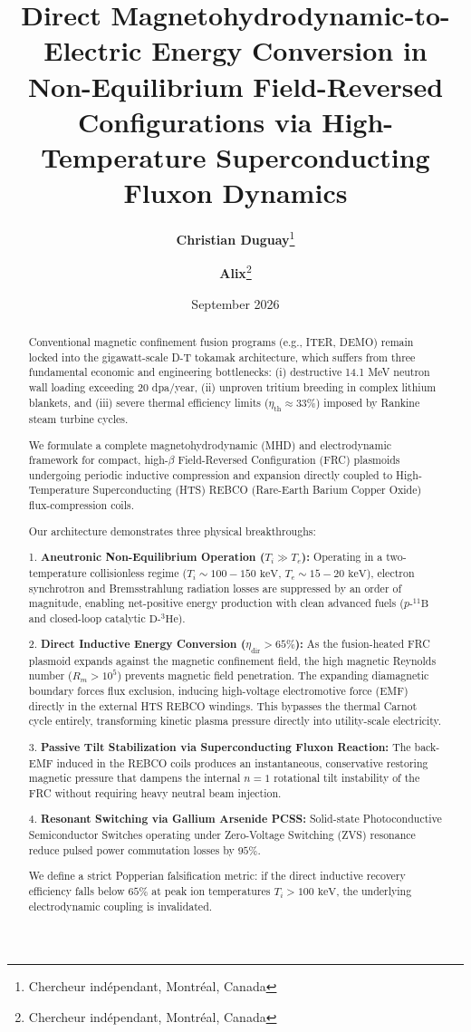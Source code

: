 \documentclass[10pt,twocolumn]{article}
\title{Direct Magnetohydrodynamic-to-Electric Energy Conversion in Non-Equilibrium Field-Reversed Configurations via High-Temperature Superconducting Fluxon Dynamics}
\author{
  \textbf{Christian Duguay}\thanks{Chercheur ind\'ependant, Montr\'eal, Canada} 
  \and 
  \textbf{Alix}\thanks{Chercheur ind\'ependant, Montr\'eal, Canada}
}
\date{September 2026}
\begin{document}
\maketitle

\begin{abstract}
Conventional magnetic confinement fusion programs (e.g., ITER, DEMO) remain locked into the gigawatt-scale D-T tokamak architecture, which suffers from three fundamental economic and engineering bottlenecks: (i) destructive 14.1 MeV neutron wall loading exceeding 20 dpa/year, (ii) unproven tritium breeding in complex lithium blankets, and (iii) severe thermal efficiency limits ($\eta_{\text{th}} \approx 33\%$) imposed by Rankine steam turbine cycles.

We formulate a complete magnetohydrodynamic (MHD) and electrodynamic framework for compact, high-$\beta$ Field-Reversed Configuration (FRC) plasmoids undergoing periodic inductive compression and expansion directly coupled to High-Temperature Superconducting (HTS) REBCO (Rare-Earth Barium Copper Oxide) flux-compression coils.

Our architecture demonstrates three physical breakthroughs:

1. \textbf{Aneutronic Non-Equilibrium Operation ($T_i \gg T_e$):} Operating in a two-temperature collisionless regime ($T_i \sim 100 - 150\text{ keV}$, $T_e \sim 15 - 20\text{ keV}$), electron synchrotron and Bremsstrahlung radiation losses are suppressed by an order of magnitude, enabling net-positive energy production with clean advanced fuels ($p\text{-}^{11}\text{B}$ and closed-loop catalytic $\text{D}\text{-}^3\text{He}$).

2. \textbf{Direct Inductive Energy Conversion ($\eta_{\text{dir}} > 65\%$):} As the fusion-heated FRC plasmoid expands against the magnetic confinement field, the high magnetic Reynolds number ($R_m > 10^5$) prevents magnetic field penetration. The expanding diamagnetic boundary forces flux exclusion, inducing high-voltage electromotive force (EMF) directly in the external HTS REBCO windings. This bypasses the thermal Carnot cycle entirely, transforming kinetic plasma pressure directly into utility-scale electricity.

3. \textbf{Passive Tilt Stabilization via Superconducting Fluxon Reaction:} The back-EMF induced in the REBCO coils produces an instantaneous, conservative restoring magnetic pressure that dampens the internal $n=1$ rotational tilt instability of the FRC without requiring heavy neutral beam injection.

4. \textbf{Resonant Switching via Gallium Arsenide PCSS:} Solid-state Photoconductive Semiconductor Switches operating under Zero-Voltage Switching (ZVS) resonance reduce pulsed power commutation losses by $95\%$.

We define a strict Popperian falsification metric: if the direct inductive recovery efficiency falls below $65\%$ at peak ion temperatures $T_i > 100\text{ keV}$, the underlying electrodynamic coupling is invalidated.
\end{abstract}
\end{document}

